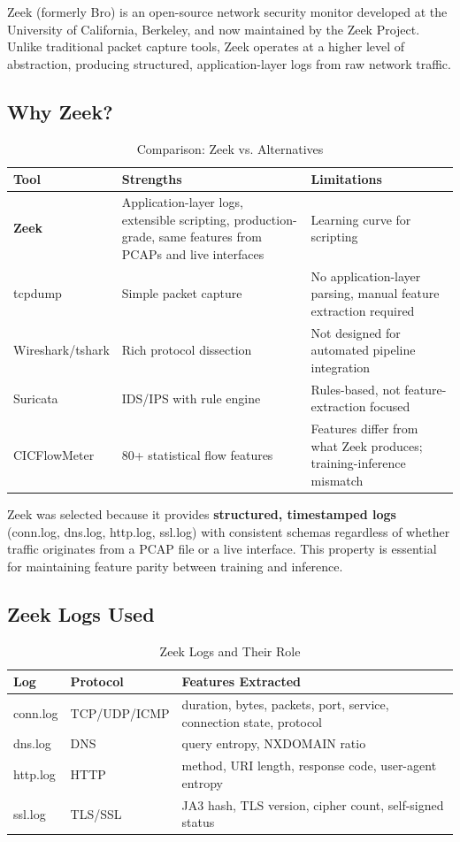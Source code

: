 \documentclass[12pt,a4paper,twoside]{report}
\begin{document}
Zeek (formerly Bro) is an open-source network security monitor developed at the University of California, Berkeley, and now maintained by the Zeek Project. Unlike traditional packet capture tools, Zeek operates at a higher level of abstraction, producing structured, application-layer logs from raw network traffic.

\subsection{Why Zeek?}

\begin{table}[H]
\centering
\caption{Comparison: Zeek vs. Alternatives}
\begin{tabularx}{\textwidth}{lXX}
\toprule
\textbf{Tool} & \textbf{Strengths} & \textbf{Limitations} \\
\midrule
\textbf{Zeek} & Application-layer logs, extensible scripting, production-grade, same features from PCAPs and live interfaces & Learning curve for scripting \\
tcpdump & Simple packet capture & No application-layer parsing, manual feature extraction required \\
Wireshark/tshark & Rich protocol dissection & Not designed for automated pipeline integration \\
Suricata & IDS/IPS with rule engine & Rules-based, not feature-extraction focused \\
CICFlowMeter & 80+ statistical flow features & Features differ from what Zeek produces; training-inference mismatch \\
\bottomrule
\end{tabularx}
\end{table}

Zeek was selected because it provides \textbf{structured, timestamped logs} (conn.log, dns.log, http.log, ssl.log) with consistent schemas regardless of whether traffic originates from a PCAP file or a live interface. This property is essential for maintaining feature parity between training and inference.

\subsection{Zeek Logs Used}

\begin{table}[H]
\centering
\caption{Zeek Logs and Their Role}
\begin{tabularx}{\textwidth}{llX}
\toprule
\textbf{Log} & \textbf{Protocol} & \textbf{Features Extracted} \\
\midrule
conn.log & TCP/UDP/ICMP & duration, bytes, packets, port, service, connection state, protocol \\
dns.log & DNS & query entropy, NXDOMAIN ratio \\
http.log & HTTP & method, URI length, response code, user-agent entropy \\
ssl.log & TLS/SSL & JA3 hash, TLS version, cipher count, self-signed status \\
\bottomrule
\end{tabularx}
\end{table}
\end{document}

